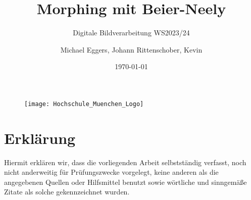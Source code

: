 
\newcommand{\leftblankpage}
{
	\begingroup
	\clearpage
	\vspace*{60mm}
	\noindent
	\centering
	\makebox[0.5\textwidth][c]{\emph{This page intentionally left blank}}
	\clearpage
	\endgroup
}

\subtitle{\LARGE Digitale Bildverarbeitung WS2023/24}
\title{Morphing mit Beier-Neely}
\author{Michael Eggers, Johann Rittenschober, Kevin}
\date{\today}

\maketitle




\begingroup
\begin{figure}[h]
	\centering
		\texttt{[image: Hochschule\_Muenchen\_Logo]}
	\label{fig:HM_FK04_Logo}
\end{figure}
\let\clearpage\relax
\chapter*{Erklärung}
\noindent
Hiermit erklären wir, dass die vorliegenden Arbeit selbstständig verfasst, noch nicht anderweitig für Prüfungszwecke vorgelegt, keine anderen als die angegebenen Quellen oder Hilfsmittel benutzt sowie wörtliche und sinngemäße Zitate als solche gekennzeichnet wurden.
\par
\vspace{20mm}
\noindent
{}

\vspace{20mm}

\noindent
{}
\par
\noindent
{}
\endgroup

